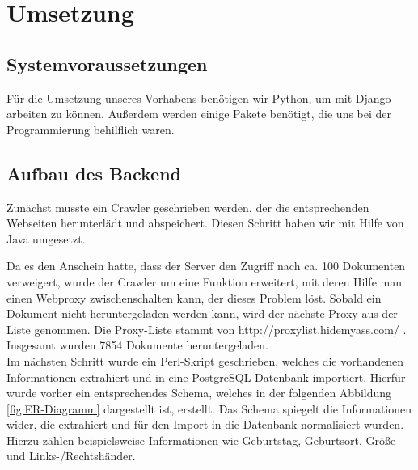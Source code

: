 \chapter{Umsetzung}
\section{Systemvoraussetzungen}
Für die Umsetzung unseres Vorhabens benötigen wir Python, um mit Django arbeiten zu können. Außerdem werden einige Pakete benötigt, die uns bei der Programmierung behilflich waren.

\section{Aufbau des Backend}
\label{Backend}
Zunächst musste ein Crawler geschrieben werden, der die entsprechenden Webseiten herunterlädt und abspeichert. Diesen Schritt haben wir mit Hilfe von Java umgesetzt. \newline

Da es den Anschein hatte, dass der Server den Zugriff nach ca. 100 Dokumenten verweigert, wurde der Crawler um eine Funktion erweitert, mit deren Hilfe man einen Webproxy zwischenschalten kann, der dieses Problem löst. Sobald ein Dokument nicht heruntergeladen werden kann, wird der nächste Proxy aus der Liste genommen. Die Proxy-Liste stammt von http://proxylist.hidemyass.com/ \cite{HMA2015}. Insgesamt wurden 7854 Dokumente heruntergeladen.\\

Im nächsten Schritt wurde ein Perl-Skript geschrieben, welches die vorhandenen Informationen extrahiert und in eine PostgreSQL Datenbank importiert. Hierfür wurde vorher ein entsprechendes Schema, welches in der folgenden Abbildung \ref{fig:ER-Diagramm} dargestellt ist, erstellt. Das Schema spiegelt die Informationen wider, die extrahiert und für den Import in die Datenbank normalisiert wurden. Hierzu zählen beispielsweise Informationen wie Geburtstag, Geburtsort, Größe und Links-/Rechtshänder.

